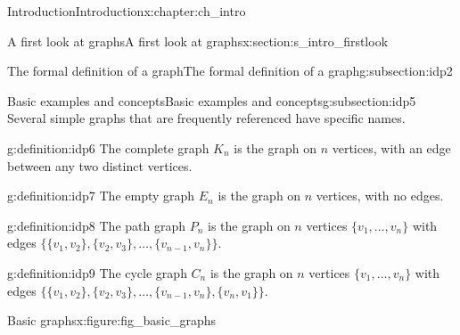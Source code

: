 \documentclass[oneside,10pt,]{book}
\numberwithin{equation}{section}
\begin{document}
\begin{chapterptx}{Introduction}{}{Introduction}{}{}{x:chapter:ch_intro}
\begin{sectionptx}{A first look at graphs}{}{A first look at graphs}{}{}{x:section:s_intro_firstlook}
\begin{subsectionptx}{The formal definition of a graph}{}{The formal definition of a graph}{}{}{g:subsection:idp2}
\end{subsectionptx}
%
%
\typeout{************************************************}
\typeout{************************************************}
%
\begin{subsectionptx}{Basic examples and concepts}{}{Basic examples and concepts}{}{}{g:subsection:idp5}
Several simple graphs that are frequently referenced have specific names.%
\begin{definition}{}{g:definition:idp6}%
The complete graph \(K_n\) is the graph on \(n\) vertices, with an edge between any two distinct vertices.%
\end{definition}
\begin{definition}{}{g:definition:idp7}%
The empty graph \(E_n\) is the graph on \(n\) vertices, with no edges.%
\end{definition}
\begin{definition}{}{g:definition:idp8}%
The path graph \(P_n\) is the graph on \(n\) vertices \(\{v_1,\dots, v_n\}\) with edges \(\{ \{v_1, v_2\}, \{v_2,v_3\},\dots,\{v_{n-1},v_n\}\}\).%
\end{definition}
\begin{definition}{}{g:definition:idp9}%
The cycle graph \(C_n\) is the graph on \(n\) vertices \(\{v_1,\dots, v_n\}\) with edges \(\{ \{v_1, v_2\}, \{v_2,v_3\},\dots,\{v_{n-1},v_n\}, \{v_n, v_1\}\}\).%
\end{definition}
\begin{figureptx}{Basic graphs}{x:figure:fig_basic_graphs}{}%
\begin{image}{0.05}{0.9}{0.05}%
\end{image}
\end{figureptx}
\end{subsectionptx}
\end{sectionptx}
\end{chapterptx}
\end{document}

